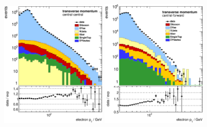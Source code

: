 \begin{figure}[hp]
    \centering
    \includegraphics[width=0.48\textwidth]{plots/pt_cc}
    \hfill
    \includegraphics[width=0.48\textwidth]{plots/pt_cf}


\end{figure}

